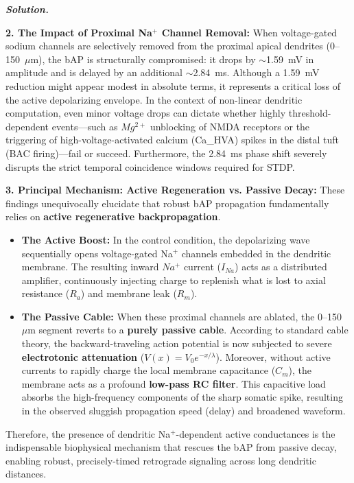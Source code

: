 \documentclass{article}
\newenvironment{solution}{%
    \par\noindent\begin{solutionbox}\textbf{\textit{Solution.}}\par\medskip\itshape
}{%
    \end{solutionbox}
}
\begin{document}
\begin{solution}
\textbf{2. The Impact of Proximal Na\(^+\) Channel Removal:} 
When voltage-gated sodium channels are selectively removed from the proximal apical dendrites (0--150~\(\mu\)m), the bAP is structurally compromised: it drops by $\sim$1.59~mV in amplitude and is delayed by an additional $\sim$2.84~ms. Although a 1.59~mV reduction might appear modest in absolute terms, it represents a critical loss of the active depolarizing envelope. In the context of non-linear dendritic computation, even minor voltage drops can dictate whether highly threshold-dependent events—such as $Mg^{2+}$ unblocking of NMDA receptors or the triggering of high-voltage-activated calcium (Ca\_HVA) spikes in the distal tuft (BAC firing)—fail or succeed. Furthermore, the 2.84~ms phase shift severely disrupts the strict temporal coincidence windows required for STDP.

\textbf{3. Principal Mechanism: Active Regeneration vs. Passive Decay:} 
These findings unequivocally elucidate that robust bAP propagation fundamentally relies on \textbf{active regenerative backpropagation}. 
\begin{itemize}
    \item \textbf{The Active Boost:} In the control condition, the depolarizing wave sequentially opens voltage-gated Na\(^+\) channels embedded in the dendritic membrane. The resulting inward $Na^+$ current ($I_{Na}$) acts as a distributed amplifier, continuously injecting charge to replenish what is lost to axial resistance ($R_a$) and membrane leak ($R_m$).
    \item \textbf{The Passive Cable:} When these proximal channels are ablated, the 0--150~\(\mu\)m segment reverts to a \textbf{purely passive cable}. According to standard cable theory, the backward-traveling action potential is now subjected to severe \textbf{electrotonic attenuation} ($V(x) = V_0 e^{-x/\lambda}$). Moreover, without active currents to rapidly charge the local membrane capacitance ($C_m$), the membrane acts as a profound \textbf{low-pass RC filter}. This capacitive load absorbs the high-frequency components of the sharp somatic spike, resulting in the observed sluggish propagation speed (delay) and broadened waveform.
\end{itemize}
Therefore, the presence of dendritic Na\(^+\)-dependent active conductances is the indispensable biophysical mechanism that rescues the bAP from passive decay, enabling robust, precisely-timed retrograde signaling across long dendritic distances.

\end{solution}
\end{document}
